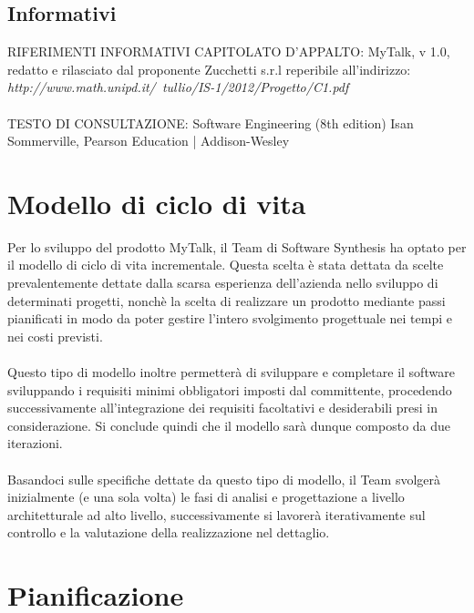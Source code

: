 \subsection{Informativi}
RIFERIMENTI INFORMATIVI
CAPITOLATO D'APPALTO: MyTalk, v 1.0, redatto e rilasciato dal proponente Zucchetti s.r.l reperibile all'indirizzo:\\ \textit{http://www.math.unipd.it/~tullio/IS-1/2012/Progetto/C1.pdf} \\\\
TESTO DI CONSULTAZIONE: Software Engineering (8th edition) Isan Sommerville, Pearson Education | Addison-Wesley


\section{Modello di ciclo di vita}
Per lo sviluppo del prodotto MyTalk, il Team di Software Synthesis ha optato per il modello di ciclo di vita incrementale. Questa scelta è stata dettata da scelte prevalentemente dettate dalla scarsa esperienza dell'azienda nello sviluppo di determinati progetti, nonchè la scelta di realizzare un prodotto mediante passi pianificati in modo da poter gestire l'intero svolgimento progettuale nei tempi e nei costi previsti.\\\\
Questo tipo di modello inoltre permetterà di sviluppare e completare il software sviluppando i requisiti minimi obbligatori imposti dal committente, procedendo successivamente all'integrazione dei requisiti facoltativi e desiderabili presi in considerazione. Si conclude quindi che il modello sarà dunque composto da due iterazioni.\\\\
Basandoci sulle specifiche dettate da questo tipo di modello, il Team svolgerà inizialmente (e una sola volta) le fasi di analisi e progettazione a livello architetturale ad alto livello, successivamente si lavorerà iterativamente sul controllo e la valutazione della realizzazione nel dettaglio.\\

\section{Pianificazione}
